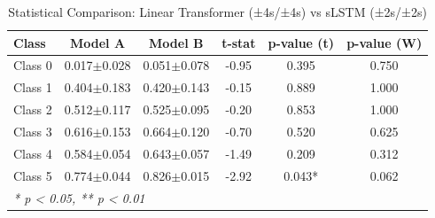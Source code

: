 \begin{table}[htbp]
\centering
\caption{Statistical Comparison: Linear Transformer (±4s/±4s) vs sLSTM (±2s/±2s)}
\label{tab:comparison_class_linear_transformer_±4s_±4s_vs_slstm_±2s_±2s}
\begin{tabular}{lccccc}
\toprule
\textbf{Class} & \textbf{Model A} & \textbf{Model B} & \textbf{t-stat} & \textbf{p-value (t)} & \textbf{p-value (W)} \\
\midrule
Class 0 & 0.017$\pm$0.028 & 0.051$\pm$0.078 & -0.95 & 0.395 & 0.750 \\
Class 1 & 0.404$\pm$0.183 & 0.420$\pm$0.143 & -0.15 & 0.889 & 1.000 \\
Class 2 & 0.512$\pm$0.117 & 0.525$\pm$0.095 & -0.20 & 0.853 & 1.000 \\
Class 3 & 0.616$\pm$0.153 & 0.664$\pm$0.120 & -0.70 & 0.520 & 0.625 \\
Class 4 & 0.584$\pm$0.054 & 0.643$\pm$0.057 & -1.49 & 0.209 & 0.312 \\
Class 5 & 0.774$\pm$0.044 & 0.826$\pm$0.015 & -2.92 & 0.043* & 0.062 \\
\bottomrule
\multicolumn{6}{l}{\textit{* p < 0.05, ** p < 0.01}} \\
\end{tabular}
\end{table}